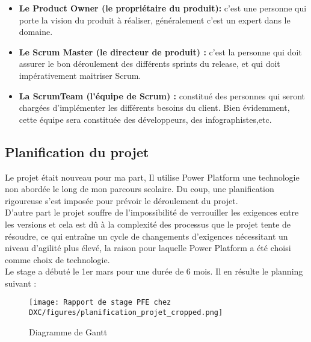 \begin{itemize}
  \item \textbf{Le Product Owner (le propriétaire du produit):}
        c’est une personne qui porte la vision du produit à réaliser, généralement c’est un expert dans le domaine.
    \\
    \item \textbf{Le Scrum Master (le directeur de produit) :}
        c'est la personne qui doit assurer le bon déroulement des différents sprints du release, et qui doit impérativement maitriser Scrum.
    \\    
    \item \textbf{La ScrumTeam (l’équipe de Scrum) :}
        constitué des personnes qui seront
        chargées d’implémenter les différents besoins du client. Bien
        évidemment, cette équipe sera constituée des développeurs, des
        infographistes,etc.
    \\    

\end{itemize}

\subsection{Planification du projet}
Le projet était nouveau pour ma part, Il utilise Power Platform une technologie non abordée le long de mon parcours scolaire. Du coup, une planification rigoureuse s’est imposée pour prévoir le déroulement du projet.
\\[0.5cm]
D'autre part le projet souffre de l'impossibilité de verrouiller les exigences entre les versions et cela est dû à la complexité des processus que le projet tente de résoudre, ce qui entraîne un cycle de changements d'exigences nécessitant un niveau d'agilité plus élevé, la raison pour laquelle Power Platform a été choisi comme choix de technologie.
\\[0.5cm]
Le stage a débuté le 1er mars pour une durée de 6 mois. Il en résulte le planning
suivant :

\begin{figure}[H]
    \centering
    \texttt{[image: Rapport de stage PFE chez DXC/figures/planification\_projet\_cropped.png]}
    \caption{Diagramme de Gantt}
\end{figure}




